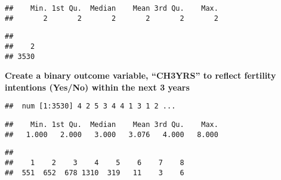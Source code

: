 \documentclass[
]{article}
\newenvironment{Shaded}{\begin{snugshade}}{\end{snugshade}}
\newcommand{\CommentTok}[1]{\textcolor[rgb]{0.56,0.35,0.01}{\textit{#1}}}
\newcommand{\FunctionTok}[1]{\textcolor[rgb]{0.13,0.29,0.53}{\textbf{#1}}}
\newcommand{\NormalTok}[1]{#1}
\newcommand{\SpecialCharTok}[1]{\textcolor[rgb]{0.81,0.36,0.00}{\textbf{#1}}}
\begin{document}
\begin{verbatim}
##    Min. 1st Qu.  Median    Mean 3rd Qu.    Max. 
##       2       2       2       2       2       2
\end{verbatim}

\begin{Shaded}
\end{Shaded}

\begin{verbatim}
## 
##    2 
## 3530
\end{verbatim}

\textbf{Create a binary outcome variable, ``CH3YRS'' to reflect
fertility intentions (Yes/No) within the next 3 years}

\begin{Shaded}
\end{Shaded}

\begin{verbatim}
##  num [1:3530] 4 2 5 3 4 4 1 3 1 2 ...
\end{verbatim}

\begin{Shaded}
\end{Shaded}

\begin{verbatim}
##    Min. 1st Qu.  Median    Mean 3rd Qu.    Max. 
##   1.000   2.000   3.000   3.076   4.000   8.000
\end{verbatim}

\begin{Shaded}
\end{Shaded}

\begin{verbatim}
## 
##    1    2    3    4    5    6    7    8 
##  551  652  678 1310  319   11    3    6
\end{verbatim}
\end{document}
